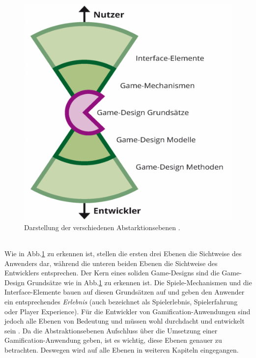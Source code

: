 \documentclass[a4paper,12pt]{scrartcl}
\begin{document}
\begin{figure}[h!]
\begin{center}
\includegraphics[scale = 0.3]{Bilder/GameElemente.eps}
\caption{Darstellung der verschiedenen Abstarktionsebenen \cite{GameElemente2018}.}
\label{GameElementeBild}
\end{center}
\end{figure}
\\
Wie in Abb.\ref{GameElementeBild} zu erkennen ist, stellen die ersten drei Ebenen die Sichtweise des Anwenders dar, während die unteren beiden Ebenen die Sichtweise des Entwicklers entsprechen. Der Kern eines soliden Game-Designs sind die Game-Design Grundsätze wie in Abb.\ref{GameElementeBild} zu erkennen ist. Die Spiele-Mechanismen und die Interface-Elemente bauen auf diesen Grundsätzen auf und geben den Anwender ein entsprechendes \textit{Erlebnis} (auch bezeichnet als Spielerlebnis, Spielerfahrung oder Player Experience). Für die Entwickler von Gamification-Anwendungen sind jedoch alle Ebenen von Bedeutung und müssen wohl durchdacht und entwickelt sein \cite{GameElemente2018}. Da die Abstraktionsebenen Aufschluss über die Umsetzung einer Gamification-Anwendung geben, ist es wichtig, diese Ebenen genauer zu betrachten. Deswegen wird auf alle Ebenen in weiteren Kapiteln eingegangen.
\end{document}
